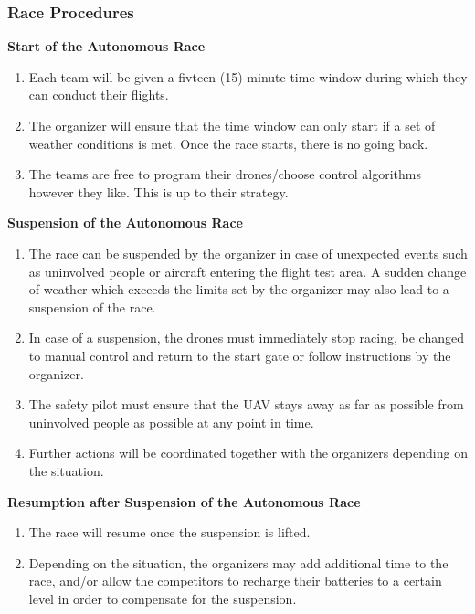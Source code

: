     \subsubsection{Race Procedures}
    \textbf{Start of the Autonomous Race}
    \begin{enumerate}
    \item Each team will be given a fivteen (15) minute time window during which they can conduct their flights. 
    \item The organizer will ensure that the time window can only start if a set of weather conditions is met. Once the race starts, there is no going back.
    \item The teams are free to program their drones/choose control algorithms however they like. This is up to their strategy. 
    \end{enumerate}

    \textbf{Suspension of the Autonomous Race}
    \begin{enumerate}[resume]
    \item The race can be suspended by the organizer in case of unexpected events such as uninvolved people or aircraft entering the flight test area. A sudden change of weather which exceeds the limits set by the organizer may also lead to a suspension of the race.
    \item In case of a suspension, the drones must immediately stop racing, be changed to manual control and return to the start gate or follow instructions by the organizer.
    \item The safety pilot must ensure that the UAV stays away as far as possible from uninvolved people as possible at any point in time.
    \item Further actions will be coordinated together with the organizers depending on the situation.
    \end{enumerate}

    \textbf{Resumption after Suspension of the Autonomous Race}
    \begin{enumerate}[resume]
    \item The race will resume once the suspension is lifted.
    \item Depending on the situation, the organizers may add additional time to the race, and/or allow the competitors to recharge their batteries to a certain level in order to compensate for the suspension.
    \end{enumerate}

    

  




